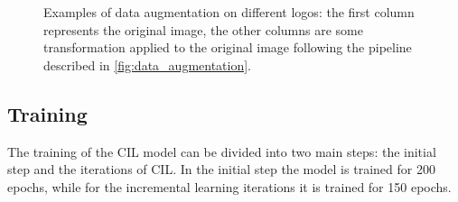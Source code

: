 \begin{figure}%
	\centering
	\hfill
	\hfill
	\hfill
	\hfill
	\hfill
	\caption{Examples of data augmentation on different logos: the first column represents the original image, the other columns are some transformation applied to the original image following the pipeline described in \autoref{fig:data_augmentation}.}%
	\label{fig:final_data_augmentation}%
\end{figure}

\subsection{Training}
The training of the CIL model can be divided into two main steps: the initial step and the iterations of CIL. In the initial step the model is trained for 200 epochs, while for the incremental learning iterations it is trained for 150 epochs.


